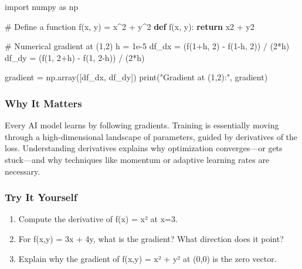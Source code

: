 \documentclass[
  letterpaper,
  DIV=11,
  numbers=noendperiod]{scrreprt}
\newenvironment{Shaded}{\begin{snugshade}}{\end{snugshade}}
\newcommand{\BuiltInTok}[1]{\textcolor[rgb]{0.00,0.23,0.31}{#1}}
\newcommand{\CommentTok}[1]{\textcolor[rgb]{0.37,0.37,0.37}{#1}}
\newcommand{\ControlFlowTok}[1]{\textcolor[rgb]{0.00,0.23,0.31}{\textbf{#1}}}
\newcommand{\DecValTok}[1]{\textcolor[rgb]{0.68,0.00,0.00}{#1}}
\newcommand{\FloatTok}[1]{\textcolor[rgb]{0.68,0.00,0.00}{#1}}
\newcommand{\ImportTok}[1]{\textcolor[rgb]{0.00,0.46,0.62}{#1}}
\newcommand{\KeywordTok}[1]{\textcolor[rgb]{0.00,0.23,0.31}{\textbf{#1}}}
\newcommand{\NormalTok}[1]{\textcolor[rgb]{0.00,0.23,0.31}{#1}}
\newcommand{\OperatorTok}[1]{\textcolor[rgb]{0.37,0.37,0.37}{#1}}
\newcommand{\StringTok}[1]{\textcolor[rgb]{0.13,0.47,0.30}{#1}}
\providecommand{\tightlist}{%
  \setlength{\itemsep}{0pt}\setlength{\parskip}{0pt}}
\begin{document}
\begin{Shaded}
\begin{Highlighting}[]
\ImportTok{import}\NormalTok{ numpy }\ImportTok{as}\NormalTok{ np}

\CommentTok{\# Define a function f(x, y) = x\^{}2 + y\^{}2}
\KeywordTok{def}\NormalTok{ f(x, y):}
    \ControlFlowTok{return}\NormalTok{ x2 }\OperatorTok{+}\NormalTok{ y2}

\CommentTok{\# Numerical gradient at (1,2)}
\NormalTok{h }\OperatorTok{=} \FloatTok{1e{-}5}
\NormalTok{df\_dx }\OperatorTok{=}\NormalTok{ (f(}\DecValTok{1}\OperatorTok{+}\NormalTok{h, }\DecValTok{2}\NormalTok{) }\OperatorTok{{-}}\NormalTok{ f(}\DecValTok{1}\OperatorTok{{-}}\NormalTok{h, }\DecValTok{2}\NormalTok{)) }\OperatorTok{/}\NormalTok{ (}\DecValTok{2}\OperatorTok{*}\NormalTok{h)}
\NormalTok{df\_dy }\OperatorTok{=}\NormalTok{ (f(}\DecValTok{1}\NormalTok{, }\DecValTok{2}\OperatorTok{+}\NormalTok{h) }\OperatorTok{{-}}\NormalTok{ f(}\DecValTok{1}\NormalTok{, }\DecValTok{2}\OperatorTok{{-}}\NormalTok{h)) }\OperatorTok{/}\NormalTok{ (}\DecValTok{2}\OperatorTok{*}\NormalTok{h)}

\NormalTok{gradient }\OperatorTok{=}\NormalTok{ np.array([df\_dx, df\_dy])}
\BuiltInTok{print}\NormalTok{(}\StringTok{"Gradient at (1,2):"}\NormalTok{, gradient)}
\end{Highlighting}
\end{Shaded}

\subsubsection{Why It Matters}\label{why-it-matters-9}

Every AI model learns by following gradients. Training is essentially
moving through a high-dimensional landscape of parameters, guided by
derivatives of the loss. Understanding derivatives explains why
optimization converges---or gets stuck---and why techniques like
momentum or adaptive learning rates are necessary.

\subsubsection{Try It Yourself}\label{try-it-yourself-111}

\begin{enumerate}
\def\labelenumi{\arabic{enumi}.}
\tightlist
\item
  Compute the derivative of f(x) = x² at x=3.
\item
  For f(x,y) = 3x + 4y, what is the gradient? What direction does it
  point?
\item
  Explain why the gradient of f(x,y) = x² + y² at (0,0) is the zero
  vector.
\end{enumerate}
\end{document}
